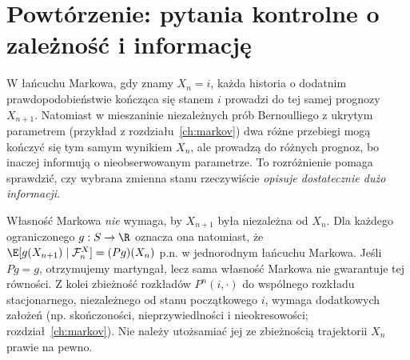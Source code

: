 \section{Powtórzenie: pytania kontrolne o zależność i informację}

\begin{przyklad}
W łańcuchu Markowa, gdy znamy $X_n=i$, każda historia
o dodatnim prawdopodobieństwie kończąca się stanem $i$
prowadzi do tej samej prognozy $X_{n+1}$.
Natomiast w mieszaninie niezależnych prób
Bernoulliego z ukrytym parametrem (przykład z
rozdziału~\ref{ch:markov}) dwa różne przebiegi
mogą kończyć się tym samym wynikiem $X_n$, ale
prowadzą do różnych prognoz, bo inaczej informują
o nieobserwowanym parametrze. To rozróżnienie
pomaga sprawdzić, czy wybrana zmienna stanu
rzeczywiście \emph{opisuje dostatecznie dużo informacji}.

Własność Markowa \emph{nie} wymaga, by $X_{n+1}$
była niezależna od $X_n$. Dla każdego ograniczonego
$g:S\to\R$ oznacza ona natomiast, że
$\E[g(X_{n+1})\mid\mathcal F_n^X]=(Pg)(X_n)$ p.n.
w jednorodnym łańcuchu Markowa.
Jeśli $Pg=g$, otrzymujemy martyngał, lecz sama
własność Markowa nie gwarantuje tej równości.
Z kolei zbieżność rozkładów $P^n(i,\cdot)$ do
wspólnego rozkładu stacjonarnego, niezależnego
od stanu początkowego $i$, wymaga dodatkowych
założeń (np. skończoności, nieprzywiedlności
i nieokresowości; rozdział~\ref{ch:markov}).
Nie należy utożsamiać jej ze zbieżnością
trajektorii $X_n$ prawie na pewno.
\end{przyklad}


